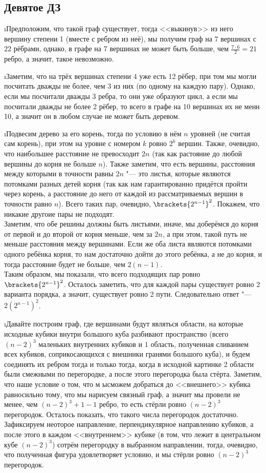 \subsection{Девятое ДЗ}


\i Предположим, что такой граф существует, тогда <<выкинув>> из него вершину степени 1 (вместе с ребром из неё), мы получим граф на 7 вершинах с 22 рёбрами, однако, в графе на 7 вершинах не может быть больше, чем $\frac{7 \cdot 6}{2} = 21$ ребро, а значит, такое невозможно.

\i Заметим, что на трёх вершинах степени 4 уже есть 12 рёбер, при том мы могли посчитать дважды не более, чем 3 из них (по одному на каждую пару). Однако, если мы посчитали дважды 3 ребра, то они уже образуют цикл, а если мы посчитали дважды не более 2 рёбер, то всего в графе на 10 вершинах их не менн 10, а значит он в любом случае не может быть деревом.

\i Подвесим дерево за его корень, тогда по условию в нём $n$ уровней (не считая сам корень), при этом на уровне с номером $k$ ровно $2^k$ вершин. Также, очевидно, что наибольшее расстояние не превосходит $2n$ (так как растояние до любой вершины до корня не больше $n$). Также заметим, что есть вершины, расстояния между которыми в точности равны $2n$ "--- это листья, которые являются потомками разных детей корня (так как нам гарантированно придётся пройти через корень, а расстояние до него от каждой из рассматриваемых вершин в точности равно $n$). Всего таких пар, очевидно, $\brackets{2^{n-1}}^2$. Покажем, что никакие другоие пары не подходят.\\
Заметим, что обе решины должны быть листьями, иначе, мы доберёмся до корня от первой и до второй от корня меньше, чем за $2n$, а при этом, такой путь не меньше расстояния между вершинами. Если же оба листа являются потомками одного ребёнка корня, то нам достаточно дойти до этого ребёнка, а не до корня, и тогда расстояние будет не больше, чем $2(n-1)$.\\
Таким образом, мы показали, что всего подходящих пар ровно $\brackets{2^{n-1}}^2$. Осталось заметить, что для каждой пары существует ровно 2 варианта порядка, а значит, существует ровно 2 пути. Следовательно ответ "--- $2(2^{n-1})^2$.

\i Давайте построим граф, где вершинами будут являться области, на которые исходные кубики внутри большого куба разбивают пространство (всего $(n-2)^3$ маленьких внутренних кубиков и $1$ область, полученная сливанием всех кубиков, соприкосающихся с внешники гранями большого куба), и будем соединять их ребром тогда и только тогда, когда в исходной картинке 2 области были смежными по перегородке, а после этого перегородка была стёрта. Заметим, что наше условие о том, что м ысможем добраться до <<внешнего>> кубика равносильно тому, что мы нарисуем связный граф, а значит мы провели не менее, чем $(n-2)^3 + 1 - 1$ ребро, то есть стёрли ровно $(n-2)^3$ перегородок. Осталось показать, что такого числа перегородок достаточно. Зафиксируем неоторое направление, перпендикулярное направлению кубиков, а после этого в каждом <<внутреннем>> кубике (в том, что лежит в центральном кубе $(n-2)^3$) сотрём перегородку в выбранном направлении, тогда, очевидно, что полученная фигура удовлетворяет условию, и мы стёрли ровно $(n-2)^3$ перегородок.

